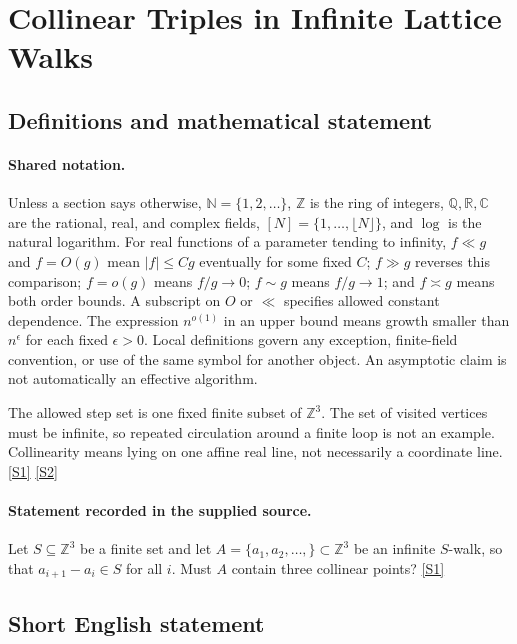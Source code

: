 \documentclass[11pt,a4paper]{article}
\newcommand{\N}{\mathbb{N}}
\newcommand{\Z}{\mathbb{Z}}
\newcommand{\Q}{\mathbb{Q}}
\newcommand{\R}{\mathbb{R}}
\newcommand{\C}{\mathbb{C}}
\newcommand{\sref}[2]{\hyperlink{source:#1:#2}{[S#2]}}
\begin{document}
\section{Collinear Triples in Infinite Lattice Walks}\label{statement}


\subsection{Definitions and mathematical statement}

\paragraph{Shared notation.}Unless a section says otherwise, $\N=\{1,2,\ldots\}$,
$\Z$ is the ring of integers, $\Q,\R,\C$ are the rational, real, and complex
fields, $[N]=\{1,\ldots,\lfloor N\rfloor\}$, and $\log$ is the natural
logarithm. For real functions of a parameter tending to infinity,
$f\ll g$ and $f=O(g)$ mean $|f|\leq Cg$ eventually for some fixed $C$;
$f\gg g$ reverses this comparison; $f=o(g)$ means $f/g\to0$;
$f\sim g$ means $f/g\to1$; and $f\asymp g$ means both order bounds.
A subscript on $O$ or $\ll$ specifies allowed constant dependence.
The expression $n^{o(1)}$ in an upper bound means growth smaller than
$n^\epsilon$ for each fixed $\epsilon>0$. Local definitions govern any
exception, finite-field convention, or use of the same symbol for another
object. An asymptotic claim is not automatically an effective algorithm.



The allowed step set is one fixed finite subset of $\Z^3$. The set of visited vertices must be infinite, so repeated circulation around a finite loop is not an example. Collinearity means lying on one affine real line, not necessarily a coordinate line. \sref{statement}{1} \sref{statement}{2}

\paragraph{Statement recorded in the supplied source.}
Let $S\subseteq \mathbb{Z}^3$ be a finite set and let $A=\{a_1,a_2,\ldots,\}\subset \mathbb{Z}^3$ be an infinite $S$-walk, so that $a_{i+1}-a_i\in S$ for all $i$. Must $A$ contain three collinear points? \sref{statement}{1}

\subsection{Short English statement}
\end{document}
